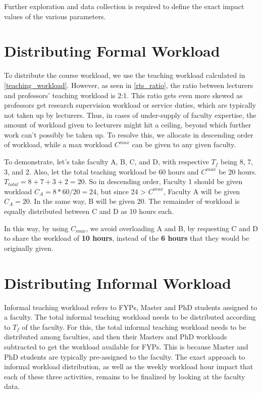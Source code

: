 Further exploration and data collection is required to define the exact impact values of the various parameters.

\section{Distributing Formal Workload}
\label{section:distributing_formal_workload}

To distribute the course workload, we use the teaching workload calculated in \autoref{teaching_workload}. However, as seen in \autoref{rts_ratio}, the ratio between lecturers and professors' teaching workload is 2:1. This ratio gets even more skewed as professors get research supervision workload or service duties, which are typically not taken up by lecturers. Thus, in cases of under-supply of faculty expertise, the amount of workload given to lecturers might hit a ceiling, beyond which further work can't possibly be taken up. To resolve this, we allocate in descending order of workload, while a max workload \(C^{max}\) can be given to any given faculty.

To demonstrate, let's take faculty A, B, C, and D, with respective \(T_f\) being 8, 7, 3, and 2. Also, let the total teaching workload be 60 hours and \(C^{max}\) be 20 hours. \(T_{total}= 8+7+3+2 = 20\). So in descending order, Faculty 1 should be given workload \(C_A = 8*60/20=24\), but since 24 > \(C^{max}\), Faculty A will be given \(C_A = 20\). In the same way, B will be given 20. The remainder of workload is equally distributed between C and D as 10 hours each. 

In this way, by using \(C_{max}\), we avoid overloading A and B, by requesting C and D to share the workload of \textbf{10 hours}, instead of the \textbf{6 hours} that they would be originally given.

\section{Distributing Informal Workload}
Informal teaching workload refers to FYPs, Master and PhD students assigned to a faculty. The total informal teaching workload needs to be distributed according to \(T_f\) of the faculty. For this, the total informal teaching workload needs to be distributed among faculties, and then their Masters and PhD workloads subtracted to get the workload available for FYPs. This is because Master and PhD students are typically pre-assigned to the faculty. The exact approach to informal workload distribution, as well as the weekly workload hour impact that each of these three activities, remains to be finalized by looking at the faculty data.